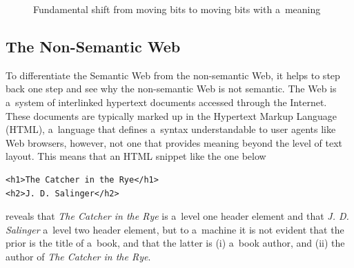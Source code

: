 \begin{figure}[!ht]
\centering
  \caption{Fundamental shift from moving bits to moving bits with a~meaning}
  \label{fig:fundamental-shift}
\end{figure}

\subsection{The Non-Semantic Web} \label{sec:non-semantic-web}

To differentiate the Semantic Web from the non-semantic Web,
it helps to step back one step and
see why the non-semantic Web is not semantic.
The Web is a~system of interlinked hypertext documents
accessed through the Internet.
These documents are typically marked up in
the Hypertext Markup Language (HTML),
a~language that defines a~syntax
understandable to user agents like Web browsers,
however, not one that provides meaning
beyond the level of text layout.
This means that an HTML snippet like the one below
\begin{verbatim}
<h1>The Catcher in the Rye</h1>
<h2>J. D. Salinger</h2>
\end{verbatim}
reveals that \emph{The Catcher in the Rye}
is a~level one header element and
that \emph{J. D. Salinger} a~level two header element,
but to a~machine it is not evident that the prior
is the title of a~book,
and that the latter is (i) a~book author, and (ii)
the author of \emph{The Catcher in the Rye}.

